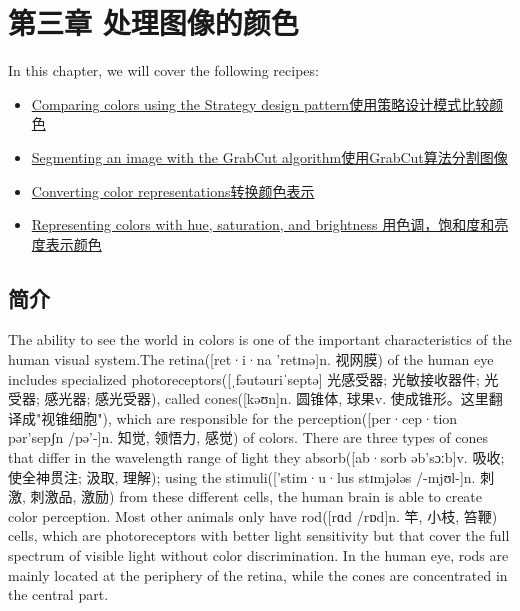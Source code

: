\documentclass[]{article}
\date{}
\begin{document}
\hypertarget{header-n1145}{%
\section{第三章 处理图像的颜色}\label{header-n1145}}

In this chapter, we will cover the following recipes:

\begin{itemize}
\item
  \protect\hyperlink{ch3_sdp}{Comparing colors using the Strategy design
  pattern使用策略设计模式比较颜色}
\item
  \protect\hyperlink{ch3_grabcut}{Segmenting an image with the GrabCut
  algorithm使用GrabCut算法分割图像}
\item
  \protect\hyperlink{ch3_ccr}{Converting color
  representations转换颜色表示}
\item
  \protect\hyperlink{ch3_hsb}{Representing colors with hue, saturation,
  and brightness 用色调，饱和度和亮度表示颜色}
\end{itemize}

\hypertarget{header-n1157}{%
\subsection{简介}\label{header-n1157}}

The ability to see the world in colors is one of the important
characteristics of the human visual system.The retina({[}ret·i·na
\textbar{}\textbar{} 'retɪnə{]}n. 视网膜) of the human eye includes
specialized photoreceptors({[}ˌfəutəuriˈseptə{]} 光感受器; 光敏接收器件;
光受器; 感光器; 感光受器), called cones({[}kəʊn{]}n. 圆锥体, 球果v.
使成锥形。这里翻译成"视锥细胞"), which are responsible for the
perception({[}per·cep·tion \textbar{}\textbar{} pər'sepʃn /pə'-{]}n.
知觉, 领悟力, 感觉) of colors. There are three types of cones that
differ in the wavelength range of light they absorb({[}ab·sorb
\textbar{}\textbar{} əb'sɔːb{]}v. 吸收; 使全神贯注; 汲取, 理解); using
the stimuli({[}'stim·u·lus \textbar{}\textbar{} stɪmjələs /-mjʊl-{]}n.
刺激, 刺激品, 激励) from these different cells, the human brain is able
to create color perception. Most other animals only have rod({[}rɑd
/rɒd{]}n. 竿, 小枝, 笞鞭) cells, which are photoreceptors with better
light sensitivity but that cover the full spectrum of visible light
without color discrimination. In the human eye, rods are mainly located
at the periphery of the retina, while the cones are concentrated in the
central part.
\end{document}
